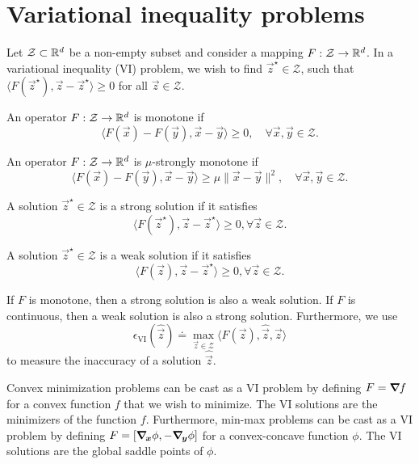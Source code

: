 \section{Variational inequality problems}

Let $\mathcal{Z} \subset \mathbb{R}^d$ be a non-empty subset and consider a mapping $F: \mathcal{Z} \to
    \mathbb{R}^d$. In a variational inequality (VI) problem, we wish to find $\vec{z}^\star \in \mathcal{Z}$,
such that $\langle F(\vec{z}^\star), \vec{z} - \vec{z}^\star \rangle \geq 0$ for all $\vec{z} \in
    \mathcal{Z}$.

\begin{definition}
    An operator $F: \mathcal{Z} \to \mathbb{R}^d$ is monotone if \[
        \langle F(\vec{x}) - F(\vec{y}), \vec{x} - \vec{y} \rangle \geq 0, \quad \forall \vec{x}, \vec{y} \in \mathcal{Z}.
    \]
\end{definition}

\begin{definition}
    An operator $F: \mathcal{Z} \to \mathbb{R}^d$ is $\mu$-strongly monotone if \[
        \langle F(\vec{x}) - F(\vec{y}), \vec{x} - \vec{y} \rangle \geq \mu \| \vec{x} - \vec{y} \|^2, \quad \forall \vec{x}, \vec{y} \in \mathcal{Z}.
    \]
\end{definition}

\begin{definition}
    A solution $\vec{z}^\star \in \mathcal{Z}$ is a strong solution if it satisfies \[
        \langle F(\vec{z}^\star), \vec{z} - \vec{z}^\star \rangle \geq 0, \forall \vec{z} \in \mathcal{Z}.
    \]
\end{definition}

\begin{definition}
    A solution $\vec{z}^\star \in \mathcal{Z}$ is a weak solution if it satisfies \[
        \langle F(\vec{z}), \vec{z} - \vec{z}^\star \rangle \geq 0, \forall \vec{z} \in \mathcal{Z}.
    \]
\end{definition}

If $F$ is monotone, then a strong solution is also a weak solution. If $F$ is continuous, then a
weak solution is also a strong solution. Furthermore, we use \[
    \epsilon_{\mathrm{VI}}(\hat{\vec{z}}) \doteq \max_{\vec{z} \in \mathcal{Z}} \langle F(\vec{z}), \hat{\vec{z}}, \vec{z} \rangle
\]
to measure the inaccuracy of a solution $\hat{\vec{z}}$.

Convex minimization problems can be cast as a VI problem by defining $F = \bm{\nabla}_{\! } f$ for a convex
function $f$ that we wish to minimize. The VI solutions are the minimizers of the function $f$.
Furthermore, min-max problems can be cast as a VI problem by defining $F = [\bm{\nabla}_{\! \bm{x}} \phi,
    -\bm{\nabla}_{\! \bm{y}} \phi]$ for a convex-concave function $\phi$. The VI solutions are the global
saddle points of $\phi$.

